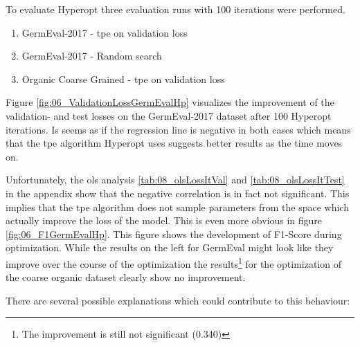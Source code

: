 To evaluate Hyperopt three evaluation runs with 100 iterations were performed.

\begin{enumerate}
	\item GermEval-2017 - \gls{tpe} on validation loss
	\item GermEval-2017 - Random search
	\item Organic Coarse Grained - \gls{tpe} on validation loss
\end{enumerate}

Figure \ref{fig:06_ValidationLossGermEvalHp} visualizes the improvement of the validation- and test losses on the GermEval-2017 dataset after 100 Hyperopt iterations. Is seems as if the regression line is negative in both cases which means that the \gls{tpe} algorithm Hyperopt uses suggests better results as the time moves on.

Unfortunately, the \gls{ols} analysis \ref{tab:08_olsLossItVal} and \ref{tab:08_olsLossItTest} in the appendix show that the negative correlation is in fact not significant. This implies that the \gls{tpe} algorithm does not sample parameters from the space which actually improve the loss of the model. This is even more obvious in figure \ref{fig:06_F1GermEvalHp}. This figure shows the development of F1-Score during optimization. While the results on the left for GermEval might look like they improve over the course of the optimization the results\footnote{The improvement is still not significant {(0.340)}} for the optimization of the coarse organic dataset clearly show no improvement.
\medskip

There are several possible explanations which could contribute to this behaviour:

